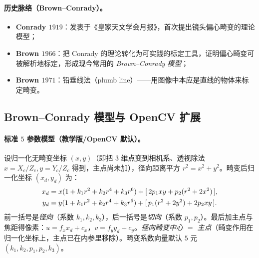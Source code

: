 \paragraph{历史脉络（Brown--Conrady）。}
\begin{itemize}
  \item \textbf{Conrady $1919$}\cite{tangram2021brown}：发表于《皇家天文学会月报》，首次提出镜头偏心畸变的理论模型；
  \item \textbf{Brown $1966$}\cite{tangram2021brown}：把 Conrady 的理论转化为可实践的标定工具，证明偏心畸变可被解析地标定，形成现今常用的 \emph{Brown--Conrady 模型}；
  \item \textbf{Brown $1971$}\cite{brown1971closerange}：铅垂线法（plumb line）——用图像中本应是直线的物体来标定畸变。
\end{itemize}

\subsection{Brown--Conrady 模型与 OpenCV 扩展}
\label{sec:calib-distortion-model}

\paragraph{标准 $5$ 参数模型（教学版/OpenCV 默认）。}
设归一化无畸变坐标 $(x,y)$（即把 $3$ 维点变到相机系、透视除法 $x=X_c/Z_c,y=Y_c/Z_c$ 得到，主点尚未加），径向距离平方 $r^2=x^2+y^2$。畸变后归一化坐标 $(x_d,y_d)$ 为\cite{vorobyev2023distortion,opencv2024calib}：
\begin{align}
  x_d &= x(1+k_1r^2+k_2r^4+k_3r^6) + [\,2p_1xy+p_2(r^2+2x^2)\,],\notag\\
  y_d &= y(1+k_1r^2+k_2r^4+k_3r^6) + [\,p_1(r^2+2y^2)+2p_2xy\,].
  \label{eq:calib-brown-conrady}
\end{align}
前一括号是\emph{径向}（系数 $k_1,k_2,k_3$），后一括号是\emph{切向}（系数 $p_1,p_2$）。最后加主点与焦距得像素：$u=f_xx_d+c_x$，$v=f_yy_d+c_y$。\emph{径向畸变中心 $=$ 主点}（畸变作用在归一化坐标上，主点已在内参里移除）。畸变系数向量默认 $5$ 元 $(k_1,k_2,p_1,p_2,k_3)$。

